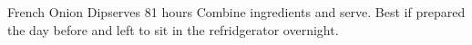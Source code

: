
\begin{recipe}{French Onion Dip}{serves 8}{1 hours}
Combine ingredients and serve.  Best if prepared the day before and left to sit in the refridgerator overnight.
\end{recipe}
